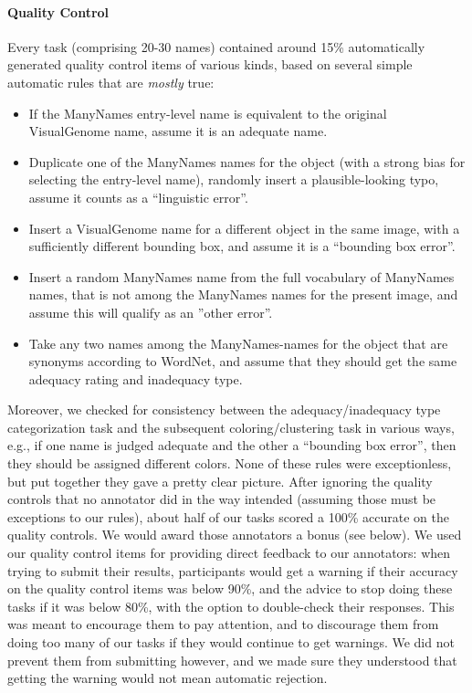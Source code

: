 \documentclass[11pt,a4paper]{article}
\newcommand{\mn}{ManyNames\xspace}
\newcommand{\vg}{VisualGenome\xspace}
\begin{document}
\paragraph{Quality Control}
Every task (comprising 20-30 names) contained around 15\% automatically generated quality control items of various kinds, based on several simple automatic rules that are \emph{mostly} true:
\begin{itemize}
	\item If the \mn entry-level name is equivalent to the original \vg name, assume it is an adequate name.
	\item Duplicate one of the \mn names for the object (with a strong bias for selecting the entry-level name), randomly insert a plausible-looking typo, assume it counts as a ``linguistic error''.
	\item Insert a \vg name for a different object in the same image, with a sufficiently different bounding box, and assume it is a ``bounding box error''.
	\item Insert a random \mn name from the full vocabulary of \mn names, that is not among the \mn names for the present image, and assume this will qualify as an ''other error''.
	\item Take any two names among the \mn-names for the object that are synonyms according to WordNet, and assume that they should get the same adequacy rating and inadequacy type.
\end{itemize}
Moreover, we checked for consistency between the adequacy/inadequacy type categorization task and the subsequent coloring/clustering task in various ways, e.g., if one name is judged adequate and the other a ``bounding box error'', then they should be assigned different colors.
None of these rules were exceptionless, but put together they gave a pretty clear picture.
After ignoring the quality controls that no annotator did in the way intended (assuming those must be exceptions to our rules), about half of our tasks scored a 100\% accurate on the quality controls.
We would award those annotators a bonus (see below).
We used our quality control items for providing direct feedback to our annotators: when trying to submit their results, participants would get a warning if their accuracy on the quality control items was below 90\%, and the advice to stop doing these tasks if it was below 80\%, with the option to double-check their responses.
This was meant to encourage them to pay attention, and to discourage them from doing too many of our tasks if they would continue to get warnings.
We did not prevent them from submitting however, and we made sure they understood that getting the warning would not mean automatic rejection.
\end{document}
